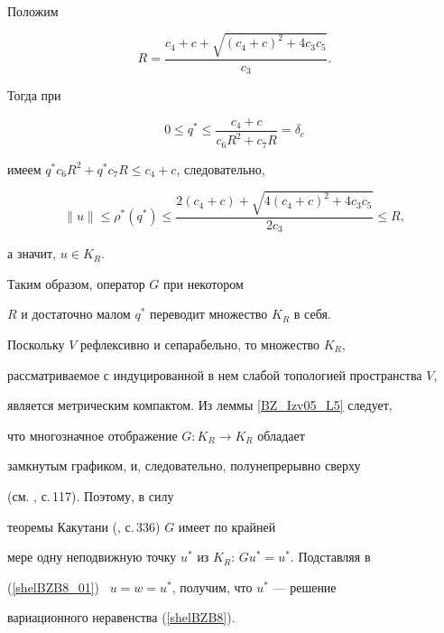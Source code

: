 \begin{pf}
\begin{multline*}
\end{multline*}





Положим


$$


R= \frac{c_4+ c+\sqrt{(c_4+c)^2+ 4 c_3 c_5}}{c_3}.


$$


Тогда при


$$


0 \leq q^* \leq \frac {c_4+c}{c_6 R^2+c_7 R}=\delta_c


$$


имеем $q^* c_6 R^2+q^* c_7 R \leq c_4+ c$, следовательно,


$$


\|u\| \leq \rho^*(q^*) \leq


\frac{2 (c_4+ c)+\sqrt{4 (c_4+c)^2+ 4 c_3 c_5}}{2 c_3}\leq R,


$$


а значит, $u \in K_R$.





Таким образом, оператор $G$ при некотором


$R$ и достаточно малом $q^*$ переводит множество $K_R$ в себя.


Поскольку $V$ рефлексивно и сепарабельно, то множество $K_R$,


рассматриваемое с индуцированной в нем слабой топологией пространства $V$,


является метрическим компактом. Из леммы \ref{BZ_Izv05_L5} следует,


что многозначное отображение $G : K_R \rightarrow K_R$ обладает


замкнутым графиком, и, следовательно, полунепрерывно сверху


(см. \cite{bz_Iz05_OE_88}, с.\,117). Поэтому, в силу


теоремы Какутани (\cite{bz_Iz05_OE_88}, с.\,336) $G$ имеет по крайней


мере одну неподвижную точку $u^*$ из $K_R$: $G u^*=u^*$. Подставляя в


(\ref{shelBZB8_01}) \ $u=w=u^*$, получим, что $u^*$ --- решение


вариационного неравенства (\ref{shelBZB8}).


\end{pf}








